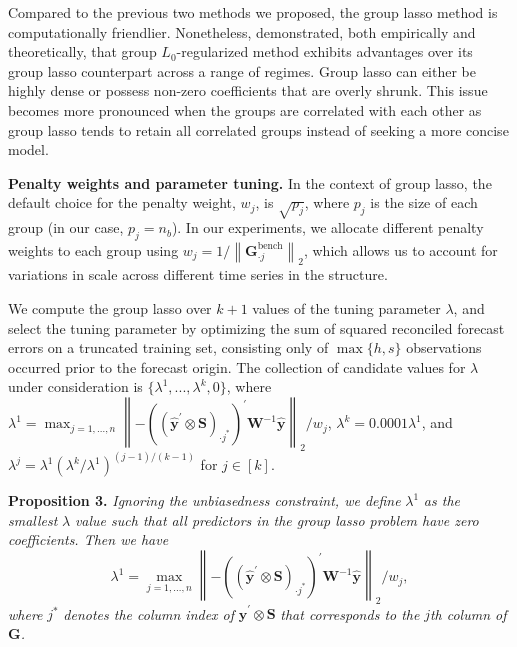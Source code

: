 \documentclass[
  12pt,
  11pt]{article}
\begin{document}
Compared to the previous two methods we proposed, the group lasso method
is computationally friendlier. Nonetheless, \citet{Hazimeh2023-ie}
demonstrated, both empirically and theoretically, that group
\(L_0\)-regularized method exhibits advantages over its group lasso
counterpart across a range of regimes. Group lasso can either be highly
dense or possess non-zero coefficients that are overly shrunk. This
issue becomes more pronounced when the groups are correlated with each
other as group lasso tends to retain all correlated groups instead of
seeking a more concise model.

\textbf{Penalty weights and parameter tuning.} In the context of group
lasso, the default choice for the penalty weight, \(w_j\), is
\(\sqrt{p_j}\), where \(p_j\) is the size of each group (in our case,
\(p_j = n_b\)). In our experiments, we allocate different penalty
weights to each group using
\(w_j = 1/\left\|\bm{G}_{\cdot j}^{\text{bench}}\right\|_2\), which
allows us to account for variations in scale across different time
series in the structure.

We compute the group lasso over \(k+1\) values of the tuning parameter
\(\lambda\), and select the tuning parameter by optimizing the sum of
squared reconciled forecast errors on a truncated training set,
consisting only of \(\max\{h, s\}\) observations occurred prior to the
forecast origin. The collection of candidate values for \(\lambda\)
under consideration is \(\{\lambda^{1},...,\lambda^{k}, 0\}\), where
\(\lambda^{1} = \max _{j=1, \ldots, n}\left\|-\left(\left(\hat{\bm{y}}^{\prime} \otimes \bm{S}\right)_{\cdot j^{*}}\right)^{\prime} \bm{W}^{-1} \hat{\bm{y}}\right\|_2 / w_j\),
\(\lambda^{k} = 0.0001\lambda^{1}\), and
\(\lambda^{j} = \lambda^{1}\left(\lambda^{k} / \lambda^{1}\right)^{(j-1) / (k-1)}\)
for \(j \in [k]\).

\textbf{Proposition 3.} \emph{Ignoring the unbiasedness constraint, we
define} \(\lambda^{1}\) \emph{as the smallest} \(\lambda\) \emph{value
such that all predictors in the group lasso problem have zero
coefficients. Then we have} \[
\lambda^{1} = \max _{j=1, \ldots, n}\left\|-\left(\left(\hat{\bm{y}}^{\prime} \otimes \bm{S}\right)_{\cdot j^{*}}\right)^{\prime} \bm{W}^{-1} \hat{\bm{y}}\right\|_2 / w_j,
\] \emph{where} \(j^{*}\) \emph{denotes the column index of}
\(\hat{\bm{y}}^{\prime} \otimes \bm{S}\) \emph{that corresponds to the}
\(j\)\emph{th column of} \(\bm{G}\)\emph{.}
\end{document}
